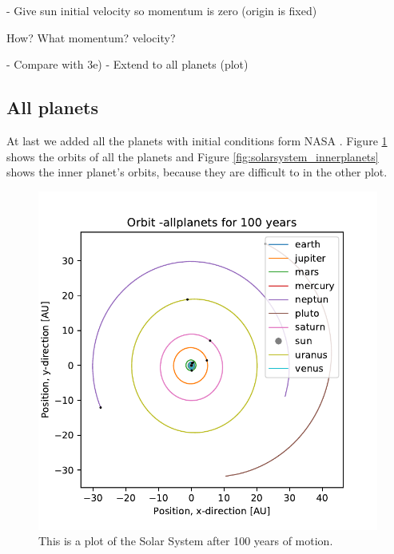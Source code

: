 	- Give sun initial velocity so momentum is zero (origin is fixed)

	How? What momentum? velocity?	
	
	- Compare with 3e)
	- Extend to all planets (plot)
	
	
\subsection{All planets}

At last we added all the planets with initial conditions form NASA \cite{nasa}. Figure \ref{fig:solarsystem_allplanets} shows the orbits of all the planets and Figure \ref{fig:solarsystem_innerplanets} shows the inner planet's orbits, because they are difficult to in the other plot.  

\begin{figure}[H]
\includegraphics[width=1\linewidth]{../results/plots/plotof-earthjupiter-allplanets.pdf}\caption{This is a plot of the Solar System after 100 years of motion.}\label{fig:solarsystem_allplanets}
\end{figure}


